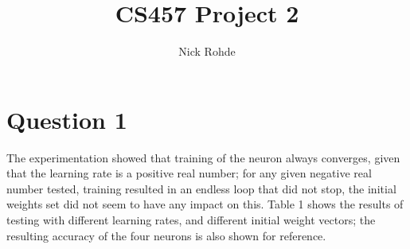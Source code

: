 \documentclass{article}
\title{CS457 Project 2}
\author{Nick Rohde}
\begin{document}
\maketitle


\section{Question 1}
The experimentation showed that training of the neuron always converges, given that the learning rate is a positive real number; for any given negative real number tested, training resulted in an endless loop that did not stop, the initial weights set did not seem to have any impact on this. Table 1 shows the results of testing with different learning rates, and different initial weight vectors; the resulting accuracy of the four neurons is also shown for reference. 
\end{document}
